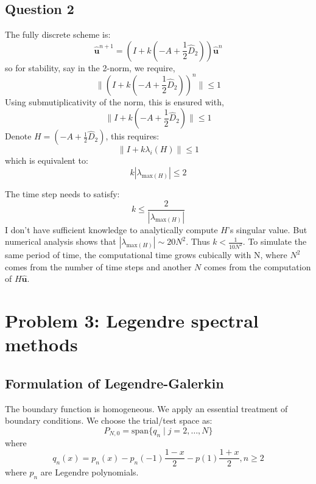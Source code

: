 \documentclass[12pt, fullpage,letterpaper]{article}
\begin{document}
\subsection{Question 2}
The fully discrete scheme is:
\begin{equation}
     \hat{\mathbf{u}}^{n+1} = (I + k( - A + \frac{1}{2} \hat{D}_2 )) \hat{\mathbf{u}}^{n} 
\end{equation}
so for stability, say in the 2-norm, we require,
\begin{equation}
     \| (I + k( - A + \frac{1}{2} \hat{D}_2 ))^n\| \leq 1
\end{equation}
Using submutiplicativity of the norm, this is ensured with,
\begin{equation}
     \| I + k( - A + \frac{1}{2} \hat{D}_2 )\| \leq 1
\end{equation}
Denote $H= ( - A + \frac{1}{2} \hat{D}_2 )$, this requires:
\begin{equation}
     \| I + k\lambda_i(H)\| \leq 1
\end{equation}
which is equivalent to:
\begin{equation}
k |\lambda_{\text{max}(H)}| \leq 2
\end{equation}

The time step needs to satisfy:
\begin{equation}
k \leq \frac{2}{|\lambda_{\text{max}(H)}|}
\end{equation}
I don't have sufficient knowledge to analytically compute $H$'s singular value. But numerical analysis shows that $|\lambda_{\text{max}(H)}| \sim 20 N^2 $.
Thus $k < \frac{1}{10N^2}$.
To simulate the same period of time, the computational time grows cubically with N, where $N^2$ comes from the number of time steps and another $N$ comes from the computation of $H\hat{\mathbf{u}} $.


\section{Problem 3: Legendre spectral methods}
\subsection{Formulation of Legendre-Galerkin}
The boundary function is homogeneous. We apply an essential treatment of boundary conditions. 
We choose the trial/test space as:
\begin{equation}
    P_{N,0} = \text{span}\{ q_n \mid j =2, \dots , N\}
\end{equation}
where
\begin{equation}
    q_n(x) = p_n(x) - p_n(-1)\frac{1-x}{2} - p(1)\frac{1+x}{2}, n \geq 2
\end{equation}
where $p_n$ are Legendre polynomials.
\end{document}
